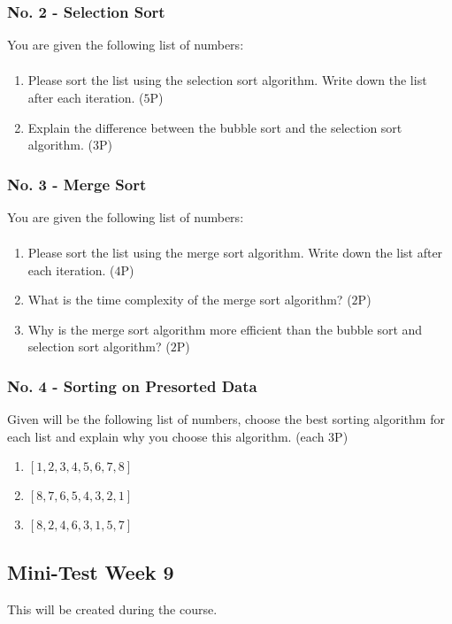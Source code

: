 \documentclass[10pt, oneside]{article}
\theoremstyle{remark}
\begin{document}
\subsubsection{No. 2 - Selection Sort}
You are given the following list of numbers:
\begin{align*}
  [12, 3, 5, 7, 1, 9, 4, 6]
\end{align*}
\begin{enumerate}
  \item Please sort the list using the selection sort algorithm. Write down the list after each iteration. ($5$P)
  \item Explain the difference between the bubble sort and the selection sort algorithm. ($3$P)
\end{enumerate}

\subsubsection{No. 3 - Merge Sort}
You are given the following list of numbers:
\begin{align*}
  [8, 2, 4, 6, 3, 1, 5, 7]
\end{align*}
\begin{enumerate}
  \item Please sort the list using the merge sort algorithm. Write down the list after each iteration. ($4$P)
  \item What is the time complexity of the merge sort algorithm? ($2$P)
  \item Why is the merge sort algorithm more efficient than the bubble sort and selection sort algorithm? ($2$P)
\end{enumerate}

\subsubsection{No. 4 - Sorting on Presorted Data}
Given will be the following list of numbers, choose the best sorting algorithm for each list and explain why you choose this algorithm. (each $3$P)
\begin{enumerate}
  \item $[1, 2, 3, 4, 5, 6, 7, 8]$
  \item $[8, 7, 6, 5, 4, 3, 2, 1]$
  \item $[8, 2, 4, 6, 3, 1, 5, 7]$
\end{enumerate}

\subsection{Mini-Test Week 9}
This will be created during the course.
\end{document}
